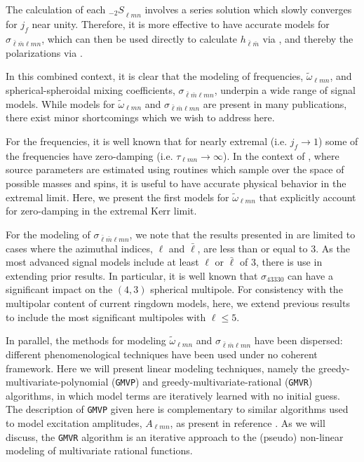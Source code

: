 \documentclass[twocolumn,aps,prd,floatfix,preprintnumbers,a4paper,nofootinbib,
superscriptaddress,10pt]{revtex4-1}
\newcommand{\cw}{\tilde{\omega}}
\def\jf{j_f}
\def\lmn{_{\ell m n}}
\def\LM{_{\bar{\ell} \bar{m}}}
\def\LMlmn{_{\bar{\ell} \bar{m} \ell m n}}
\def\gmvp#1{greedy-multivariate-polynomial#1
  (\texttt{GMVP}#1)\gdef\gmvp{\texttt{GMVP}}}
\def\gmvr#1{greedy-multivariate-rational#1
  (\texttt{GMVR}#1)\gdef\gmvr{\texttt{GMVR}}}
\begin{document}
%
The calculation of each ${_{-2}S}\lmn$ involves a series solution which slowly converges for $\jf$ near unity. Therefore, it is more effective to have accurate models for $\sigma\LMlmn$, which can then be used directly to calculate $h\LM$ via , and thereby the \gw{} polarizations via .
%
%
\par In this combined context, it is clear that the modeling of \qnm{} frequencies, $\cw\lmn$, and spherical-spheroidal mixing coefficients, $\sigma\LMlmn$, underpin a wide range of \gw{} signal models.
%
While models for $\cw\lmn$ and $\sigma\LMlmn$ are present in many publications, there exist minor shortcomings which we wish to address here.
%
\par For the \qnm{} frequencies, it is well known that for nearly extremal  (i.e. $\jf \rightarrow 1$) some of the frequencies have zero-damping (i.e. $\tau\lmn \rightarrow \infty$).
%
In the context of \aligo{} \da{}, where source parameters are estimated using routines which sample over the space of possible \bh{} masses and spins, it is useful to have accurate physical behavior in the extremal limit.
%
Here, we present the first models for $\cw\lmn$ that explicitly account for zero-damping in the extremal Kerr limit.
%
\par For the modeling of $\sigma\LMlmn$, we note that the results presented in \red{[X]} are limited to cases where the azimuthal indices, $\ell$ and $\bar{\ell}$, are less than or equal to 3.
%
As the most advanced signal models include at least $\ell$ or $\bar{\ell}$ of 3, there is use in extending prior results.
%
In particular, it is well known that $\sigma_{43330}$ can have a significant impact on the $(4,3)$ spherical multipole.
%
For consistency with the multipolar content of current ringdown models, here, we extend previous results to include the most significant multipoles with $\ell \leq 5$.
%
%
\par In parallel, the methods for modeling $\cw\lmn$ and $\sigma\LMlmn$ have been dispersed: different phenomenological techniques have been used under no coherent framework.
%
Here we will present linear modeling techniques, namely the \gmvp{} and \gmvr{} algorithms, in which model terms are iteratively learned with no initial guess.
%
The description of \gmvp{} given here is complementary to similar algorithms used to model \qnm{} excitation amplitudes, $A\lmn$, as present in reference \red{[cite]}.
%
As we will discuss, the \gmvr{} algorithm is an iterative approach to the (pseudo) non-linear modeling of multivariate rational functions.
\end{document}
